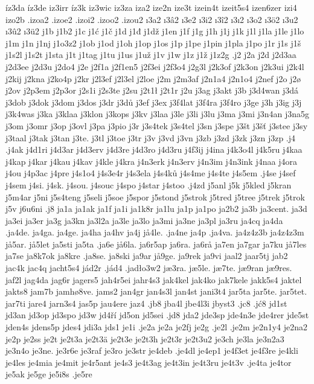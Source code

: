 {{íz3da
íz3de
iz3irr
íz3k
iz3wic
iz3za
iza2
ize2n
ize3t
izein4t
izeit5s4
izen6zer
izi4
izo2b
.izoa2
.izoe2
.izoi2
.izoo2
.izou2
ı3a2
ı3â2
ı3e2
ı3i2
ı3î2
ı3ı2
ı3o2
ı3ö2
ı3u2
ı3û2
ı3ü2
j1b
j1b2
j1c
j1ć
j1č
j1d
j1đ
j1dž
j1en
j1f
j1g
j1h
j1j
j1k
j1l
j1la
j1le
j1lo
j1m
j1n
j1nj
j1o3z2
j1ob
j1od
j1oh
j1op
j1os
j1p
j1pe
j1pin
j1pla
j1po
j1r
j1s
j1š
j1s2l
j1s2t
j1sta
j1t
j1tag
j1tu
j1us
j1už
j1v
j1w
j1z
j1ž
j1z2g
.j2
j2a
j2d
j2d3aa
j2d3ee
j2d3u
j2do4
j2e
j2f1a
j2f1en5
j2f3ei
j2f3o4
j2g3l
j2k3of
j2k3on
j2k3ui
j2k4l
j2kij
j2kna
j2ko4p
j2kr
j2l3ef
j2l3el
j2loe
j2m
j2m3af
j2n1a4
j2n1o4
j2nef
j2o
j2ø
j2ov
j2p3em
j2p3or
j2s1i
j2s3te
j2su
j2t1ł
j2t1r
j2u
j3ag
j3akt
j3b
j3d4wan
j3dá
j3dob
j3dok
j3dom
j3dos
j3dr
j3dů
j3ef
j3ex
j3f4lat
j3f4ra
j3f4ro
j3ge
j3h
j3ig
j3j
j3k4was
j3ka
j3klaa
j3klon
j3kops
j3kv
j3laa
j3le
j3li
j3lu
j3ma
j3mi
j3n4an
j3na5g
j3om
j3omr
j3op
j3ovl
j3pa
j3pio
j3r
j3s4tek
j3s4tel
j3sn
j3spe
j3št
j3šť
j3stee
j3sy
j3taal
j3tak
j3tan
j3te.
j3tl
j3toe
j3tr
j3v
j3vd
j3vn
j3zb
j3zd
j3zk
j3zn
j3zp
.j4
.j4ak
j4d1ri
j4d3ar
j4d3erv
j4d3re
j4d3ro
j4d3ru
j4f3ij
j4ina
j4k3o4l
j4k5ru
j4kaa
j4kap
j4kar
j4kau
j4kav
j4kle
j4kra
j4n3erk
j4n3erv
j4n3im
j4n3ink
j4naa
j4ora
j4ou
j4p3ac
j4pre
j4s1o4
j4s3e4r
j4s3ela
j4s4ků
j4s4me
j4s4te
j4s5em
.j4se
j4sef
j4sem
j4si.
j4sk.
j4sou.
j4souc
j4spo
j4star
j4stoo
.j4zd
j5anl
j5k
j5kled
j5kran
j5m4ar
j5ni
j5s4teng
j5seli
j5soe
j5spor
j5stond
j5strok
j5tred
j5tree
j5trek
j5trok
j5v
j6u6ni
.j8
ja1a
ja1ak
ja1f
ja1i
ja1k8r
ja1lu
ja1p
ja1po
ja2b2
ja3b
ja3cent.
ja3d
ja3ei
ja3er
ja3g
ja3kn
ja3l2a
ja3le
ja3lo
ja3mi
ja3ne
ja3pl
ja3ru
ja4cq
ja4da
.ja4de.
ja4ga.
ja4ge.
ja4ha
ja4hv
ja4j
jå4le.
.ja4ne
ja4p
.ja4va.
ja4z4z3b
ja4z4z3m
jå5ar.
jå5let
ja5sti
ja5ta
.ja6e
jå6la.
ja6r5ap
ja6ra.
ja6rå
ja7en
ja7gar
ja7ku
jå7les
ja7se
ja8k7ok
ja8kre
.ja8se.
ja8ski
ja9ar
jå9ge.
ja9rek
ja9vi
jaal2
jaar5tj
jab2
jac4k
jac4q
jacht5s4
jád2r
.jád4
.jadło3w2
jæ3ra.
jæ5le.
jæ7te.
jæ9ran
jæ9res.
jaf2l
jag4da
jag6r
jagers5
jah4r5ei
jahr4s3
jak4kel
jak4ko
jak7kele
jakk5s4
jaktel
jakts8
jam7b
jamhø8ve.
jams2
jan4gr
jan4s3l
jan4st
jani3t4
jar5ta
jar5te.
jar5tet.
jar7ti
jare4
jarn3s4
jas5p
jau4ere
jaz4
.jb8
jba4l
jbe4l3i
jbyst3
.jc8
.jć8
jd1st
jd3an
jd3op
jd3spo
jd3w
jd4ří
jd5on
jd5sei
.jd8
jda2
jde3sp
jde4n3e
jde4rer
jde5st
jden4s
jdens5p
jdes4
jdi3a
jds1
je1i
.je2a
je2a
je2fj
je2g
.je2l
.je2m
je2n1y4
je2na2
je2p
je2ss
je2t
je2t3a
je2t3ä
je2t3e
je2t3h
je2t3r
je2t3u2
je3ch
je3la
je3n2a3
je3n4o
je3ne.
je3r6e
je3raf
je3ro
je3str
je4deb
.je4dl
je4ep1
je4f3et
je4f3re
je4kli
je4les
je4mia
je4mit
je4r5ant
je4s3
je4t3ag
je4t3in
je4t3ru
je4t3v
.je4ta
je4tor
je5ak
je5ge
je5i8s
.je5re
}}
